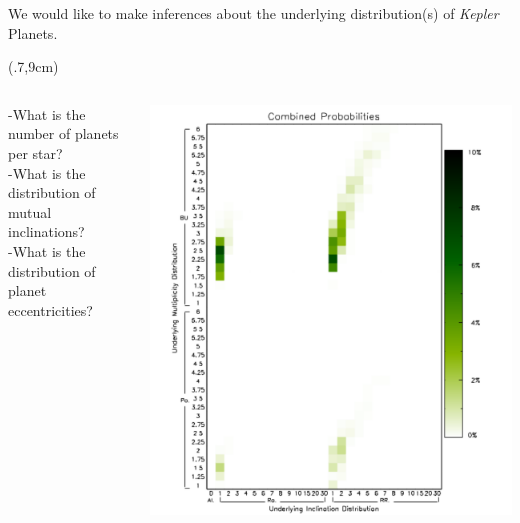 \documentclass{beamer}
\newcommand\mycite[1]{%
  \begin{textblock*}{5cm}(.7\textwidth,9cm)%
    #1
  \end{textblock*}
}
\begin{document}
\begin{frame}{We would like to make inferences about the underlying distribution(s) of \emph{Kepler} Planets.}
\mycite{\cite{Fang:2012}}
\begin{columns}[c] 
\begin{column}[T]{4cm}
-What is the  number of planets per star? \\ 
\vspace{0.5cm}
-What is the distribution of mutual inclinations? \\
\vspace{0.5cm}
-What is the distribution of planet eccentricities? \\


\end{column}
\begin{column}[T]{6cm}
\includegraphics[scale=.35]{fang.pdf}
\end{column}
\end{columns}
\end{frame}
\end{document}
